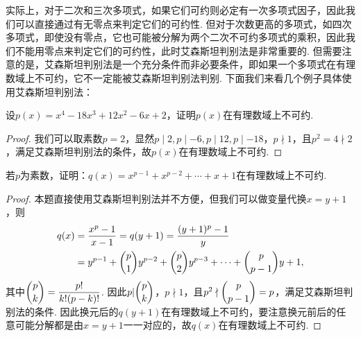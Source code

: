 实际上，对于二次和三次多项式，如果它们可约则必定有一次多项式因子，因此我们可以直接通过有无零点来判定它们的可约性. 但对于次数更高的多项式，如四次多项式，即使没有零点，它也可能被分解为两个二次不可约多项式的乘积，因此我们不能用零点来判定它们的可约性，此时艾森斯坦判别法是非常重要的. 但需要注意的是，艾森斯坦判别法是一个充分条件而非必要条件，即如果一个多项式在有理数域上不可约，它不一定能被艾森斯坦判别法判别. 下面我们来看几个例子具体使用艾森斯坦判别法：
\begin{example}{}{}
    设$p(x)=x^4-18x^3+12x^2-6x+2$，证明$p(x)$在有理数域上不可约.
\end{example}
\begin{proof}
    我们可以取素数$p=2$，显然$p\mid 2,p\mid -6,p\mid 12,p\mid -18$，$p\nmid 1$，且$p^2=4\nmid 2$，满足艾森斯坦判别法的条件，故$p(x)$在有理数域上不可约.
\end{proof}

\begin{example}{}{}
    若$p$为素数，证明：$q(x)=x^{p-1}+x^{p-2}+\cdots+x+1$在有理数域上不可约.
\end{example}
\begin{proof}
    本题直接使用艾森斯坦判别法并不方便，但我们可以做变量代换$x=y+1$，则
    \begin{align*}
        q(x) & =\dfrac{x^p-1}{x-1}=q(y+1)=\dfrac{(y+1)^p-1}{y}                               \\
             & =y^{p-1}+\dbinom{p}{1}y^{p-2}+\dbinom{p}{2}y^{p-3}+\cdots+\dbinom{p}{p-1}y+1,
    \end{align*}
    其中$\dbinom{p}{k}=\dfrac{p!}{k!(p-k)!}$. 因此$p|\dbinom{p}{k}$，$p\nmid 1$，且$p^2\nmid \dbinom{p}{p-1}=p$，满足艾森斯坦判别法的条件. 因此换元后的$q(y+1)$在有理数域上不可约，要注意换元前后的任意可能分解都是由$x=y+1$一一对应的，故$q(x)$在有理数域上不可约.
\end{proof}

